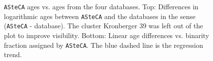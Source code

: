 \documentclass{aa}
\begin{document}
  \begin{figure}
   \caption{\texttt{ASteCA} ages vs. ages from the four databases.
   Top: Differences in logarithmic ages between \texttt{ASteCA} and
   the databases in the sense (\texttt{ASteCA} - database). The cluster
   Kronberger 39 was left out of the plot to improve visibility.
   Bottom: Linear age differences vs. binarity fraction assigned by
   \texttt{ASteCA}. The blue dashed line is the regression trend.}
   \label{fig:ages}
  \end{figure}

\end{document}
